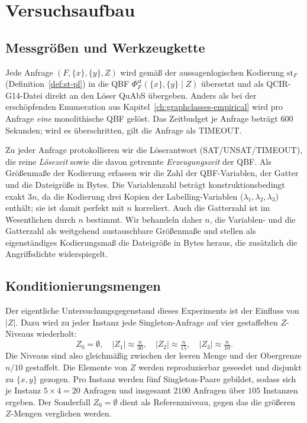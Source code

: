\section{Versuchsaufbau}
\label{sec:sz-aufbau}

\subsection{Messgr\"o\ss en und Werkzeugkette}
\label{subsec:sz-werkzeug}

Jede Anfrage \((F,\{x\},\{y\},Z)\) wird gem\"a\ss{} der aussagenlogischen
Kodierung \(\mathrm{st}_F\) (Definition~\ref{def:st-pl}) in die QBF
\(\Phi^{\mathrm{st}}_F(\{x\},\{y\}\mid Z)\) \"ubersetzt und als QCIR-G14-Datei
direkt an den L\"oser QuAbS \"ubergeben. Anders als bei der ersch\"opfenden
Enumeration aus Kapitel~\ref{ch:graphclasses-empirical} wird pro Anfrage
\emph{eine} monolithische QBF gel\"ost. Das Zeitbudget je Anfrage betr\"agt
\(600\) Sekunden; wird es \"uberschritten, gilt die Anfrage als TIMEOUT.

Zu jeder Anfrage protokollieren wir die L\"oserantwort
(SAT/UNSAT/TIMEOUT), die reine \emph{L\"osezeit} sowie die davon getrennte
\emph{Erzeugungszeit} der QBF. Als Gr\"o\ss enma\ss e der Kodierung erfassen wir
die Zahl der QBF-Variablen, der Gatter und die Dateigr\"o\ss e in Bytes. Die
Variablenzahl betr\"agt konstruktionsbedingt exakt \(3n\), da die Kodierung
drei Kopien der Labelling-Variablen (\(\lambda_1,\lambda_2,\lambda_3\))
enth\"alt; sie ist damit perfekt mit \(n\) korreliert. Auch die Gatterzahl ist
im Wesentlichen durch \(n\) bestimmt. Wir behandeln daher \(n\), die
Variablen- und die Gatterzahl als weitgehend austauschbare Gr\"o\ss enma\ss e
und stellen als eigenst\"andiges Kodierungsma\ss{} die Dateigr\"o\ss e in Bytes
heraus, die zus\"atzlich die Angriffsdichte widerspiegelt.

\subsection{Konditionierungsmengen}
\label{subsec:sz-zmengen}

Der eigentliche Untersuchungsgegenstand dieses Experiments ist der Einfluss von
\(|Z|\). Dazu wird zu jeder Instanz jede Singleton-Anfrage auf vier gestaffelten
\(Z\)-Niveaus wiederholt:
\[
    Z_0=\emptyset,\quad
    |Z_1|\approx \tfrac{n}{30},\quad
    |Z_2|\approx \tfrac{n}{15},\quad
    |Z_3|\approx \tfrac{n}{10}.
\]
Die Niveaus sind also gleichm\"a\ss ig zwischen der leeren Menge und der
Obergrenze \(n/10\) gestaffelt. Die Elemente von \(Z\) werden reproduzierbar
geseedet und disjunkt zu \(\{x,y\}\) gezogen. Pro Instanz werden f\"unf
Singleton-Paare gebildet, sodass sich je Instanz \(5\times 4 = 20\) Anfragen
und insgesamt \(2100\) Anfragen \"uber \(105\) Instanzen ergeben. Der
Sonderfall \(Z_0=\emptyset\) dient als Referenzniveau, gegen das die
gr\"o\ss eren \(Z\)-Mengen verglichen werden.

